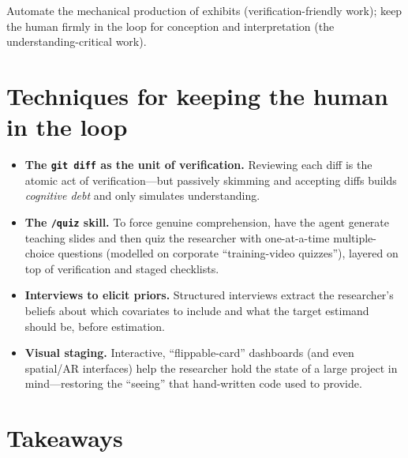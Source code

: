 \documentclass[11pt]{article}
\begin{document}
\begin{keyidea}
Automate the mechanical production of exhibits (verification-friendly work); keep
the human firmly in the loop for conception and interpretation (the
understanding-critical work).
\end{keyidea}

\section{Techniques for keeping the human in the loop}

\begin{itemize}[leftmargin=1.6em]
  \item \textbf{The \texttt{git diff} as the unit of verification.} Reviewing
  each diff is the atomic act of verification---but passively skimming and
  accepting diffs builds \emph{cognitive debt} and only simulates understanding.
  \item \textbf{The \texttt{/quiz} skill.} To force genuine comprehension, have
  the agent generate teaching slides and then quiz the researcher with
  one-at-a-time multiple-choice questions (modelled on corporate
  ``training-video quizzes''), layered on top of verification and staged
  checklists.
  \item \textbf{Interviews to elicit priors.} Structured interviews extract the
  researcher's beliefs about which covariates to include and what the target
  estimand should be, before estimation.
  \item \textbf{Visual staging.} Interactive, ``flippable-card'' dashboards (and
  even spatial/AR interfaces) help the researcher hold the state of a
  large project in mind---restoring the ``seeing'' that hand-written code used to
  provide.
\end{itemize}

\section{Takeaways}
\end{document}
